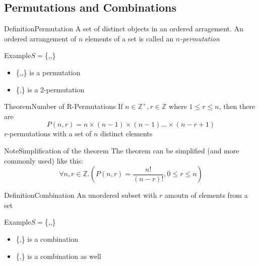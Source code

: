 \documentclass{MathNotes}
\newenvironment{example}[1]{\begin{BlueBox}{Example}{#1}}{\end{BlueBox}}
\newenvironment{definition}[1]{\begin{RedBox}{Definition}{#1}}{\end{RedBox}}
\newenvironment{note}[1]{\begin{YellowBox}{Note}{#1}}{\end{YellowBox}}
\newenvironment{theorem}[1]{\begin{GrayBox}{Theorem}{#1}}{\end{GrayBox}}
\begin{document}
\subsection{Permutations and Combinations}
\begin{multicols}{2}
	\begin{definition}{Permutation}
		A set of distinct objects in an ordered arragement. An ordered arrangement
		of $n$ elements of a set is called an \textit{$n$-permutation}
	\end{definition}
	\begin{example}{$S=$\{,,\}}
		\begin{itemize}
			\item\{,,\} is a permutation
			\item\{,\} is a 2-permutation
		\end{itemize}
	\end{example}
\end{multicols}
\begin{theorem}{Number of R-Permutations}
    If $n\in\mathbb{Z}^+,r\in\mathbb{Z}$ where $1\leq r\leq n$, then there are
    \[P(n,r)=n\times(n-1)\times(n-1)\ldots\times(n-r+1)\]
    $r$-permutations with a set of $n$ distinct elements
\end{theorem}

\begin{note}{Simplification of the theorem}
    The theorem can be simplified (and more commonly used) like this:
    \[\forall n,r\in\mathbb{Z}.\left(P(n,r)=\frac{n!}{(n-r)!},0\leq r\leq n\right)\]
\end{note}
\begin{multicols}{2}
    \begin{definition}{Combination}
        An unordered subset with $r$ amoutn of elements from a set 
    \end{definition}
    \begin{example}{$S=$\{,,\emoji{rice}\}}
    \begin{itemize}
        \item \{,\} is a combination
        \item \{,\} is a combination as well
    \end{itemize}
    \end{example}
\end{multicols}
\end{document}
